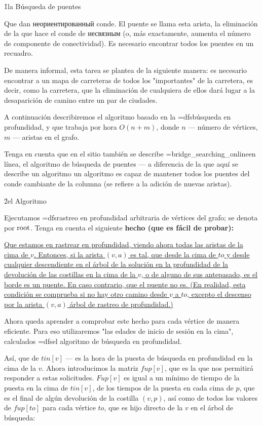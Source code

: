 \h1{la Búsqueda de puentes}

Que dan неориентированный conde. El puente se llama esta arista, la eliminación de la que hace el conde de несвязным (o, más exactamente, aumenta el número de componente de conectividad). Es necesario encontrar todos los puentes en un recuadro.

De manera informal, esta tarea se plantea de la siguiente manera: es necesario encontrar a un mapa de carreteras de todos los "importantes" de la carretera, es decir, como la carretera, que la eliminación de cualquiera de ellos dará lugar a la desaparición de camino entre un par de ciudades.

A continuación describiremos el algoritmo basado en la \algohref=dfs{búsqueda en profundidad}, y que trabaja por hora $O(n+m)$, donde $n$ --- número de vértices, $m$ --- aristas en el grafo.

Tenga en cuenta que en el sitio también se describe \algohref=bridge_searching_online{en línea, el algoritmo de búsqueda de puentes} --- a diferencia de la que aquí se describe un algoritmo un algoritmo es capaz de mantener todos los puentes del conde cambiante de la columna (se refiere a la adición de nuevas aristas).


\h2{el Algoritmo}

Ejecutamos \algohref=dfs{rastreo en profundidad} arbitraria de vértices del grafo; se denota por $\rm root$. Tenga en cuenta el siguiente \bf{hecho} (que es fácil de probar):

\ul{
\li Que estamos en rastrear en profundidad, viendo ahora todas las aristas de la cima de $v$. Entonces, si la arista $(v,a)$ es tal, que desde la cima de $to$ y desde cualquier descendiente en el árbol de la solución en la profundidad de la devolución de las costillas en la cima de la $v$, o de alguno de sus antepasado, es el borde es un puente. En caso contrario, que el puente no es. (En realidad, esta condición se comprueba si no hay otro camino desde $v$ a $to$, excepto el descenso por la arista $(v,a)$ árbol de rastreo de profundidad.)
}

Ahora queda aprender a comprobar este hecho para cada vértice de manera eficiente. Para eso utilizaremos "las edades de inicio de sesión en la cima", calculados \algohref=dfs{el algoritmo de búsqueda en profundidad}.

Así, que de $tin[v]$ --- es la hora de la puesta de búsqueda en profundidad en la cima de la $v$. Ahora introducimos la matriz $fup[v]$, que es la que nos permitirá responder a estas solicitudes. $Fup[v]$ es igual a un mínimo de tiempo de la puesta en la cima de $tin[v]$, de los tiempos de la puesta en cada cima de $p$, que es el final de algún devolución de la costilla $(v,p)$, así como de todos los valores de $fup[to]$ para cada vértice $to$, que es hijo directo de la $v$ en el árbol de búsqueda:

